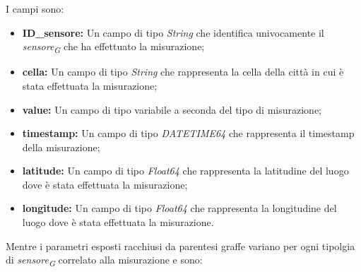 I campi sono:
\begin{itemize}
	\item \textbf{ID\_sensore:} Un campo di tipo \textit{String} che identifica univocamente il \textit{sensore}\textsubscript{\textit{G}} che ha effettuato la misurazione;
	\item \textbf{cella:} Un campo di tipo \textit{String} che rappresenta la cella della città in cui è stata effettuata la misurazione;
	\item \textbf{value:} Un campo di tipo variabile a seconda del tipo di misurazione;
	\item \textbf{timestamp:} Un campo di tipo \textit{DATETIME64} che rappresenta il timestamp della misurazione;
	\item \textbf{latitude:} Un campo di tipo \textit{Float64} che rappresenta la latitudine del luogo dove è stata effettuata la misurazione;
	\item \textbf{longitude:} Un campo di tipo \textit{Float64} che rappresenta la longitudine del luogo dove è stata effettuata la misurazione.
\end{itemize}

Mentre i parametri esposti racchiusi da parentesi graffe variano per ogni tipolgia di \textit{sensore}\textsubscript{\textit{G}} correlato alla misurazione e sono:

